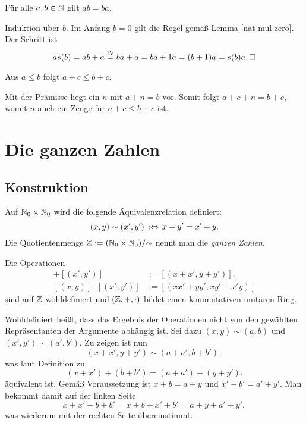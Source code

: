 \begin{Satz}\newlinefirst
Für alle $a,b\in\mathbb N$ gilt $ab=ba$.
\end{Satz}
\begin{Beweis}
Induktion über $b$. Im Anfang $b=0$ gilt die Regel gemäß
Lemma \ref{nat-mul-zero}. Der Schritt ist
\[as(b) = ab+a \stackrel{\mathrm{IV}}= ba+a = ba + 1a = (b+1)a = s(b)a.\,\Box\]
\end{Beweis}

\begin{Satz}
Aus $a\le b$ folgt $a+c\le b+c$.
\end{Satz}
\begin{Beweis}
Mit der Prämisse liegt ein $n$ mit $a+n = b$ vor. Somit folgt
$a+c+n = b+c$, womit $n$ auch ein Zeuge für $a+c\le b+c$ ist.\,\qedsymbol
\end{Beweis}

\section{Die ganzen Zahlen}

\subsection{Konstruktion}

\begin{Definition}\newlinefirst
Auf $\mathbb N_0\times\mathbb N_0$ wird die folgende Äquivalenzrelation definiert:
\[(x,y)\sim (x',y')\,:\Leftrightarrow\, x+y' = x'+y.\]
Die Quotientenmenge $\mathbb Z := (\mathbb N_0\times\mathbb N_0)/{\sim}$ nennt man
die \emph{ganzen Zahlen}.
\end{Definition}

\begin{Satz}\newlinefirst
Die Operationen
\begin{align*}
[(x,y)]+[(x',y')] &:= [(x+x',y+y')],\\
[(x,y)]\cdot [(x',y')] &:= [(xx'+yy',xy'+x'y)]
\end{align*}
sind auf $\mathbb Z$ wohldefiniert und $(\mathbb Z,+,\cdot)$ bildet einen
kommutativen unitären Ring.
\end{Satz}
 Wohldefiniert heißt, dass das Ergebnis der Operationen
nicht von den gewählten Repräsentanten der Argumente abhängig ist.
Sei dazu $(x,y)\sim(a,b)$ und
$(x',y')\sim (a',b')$. Zu zeigen ist nun
\[(x+x',y+y')\sim (a+a',b+b'),\]
was laut Definition zu
\[(x+x')+(b+b') = (a+a')+(y+y').\]
äquivalent ist. Gemäß Voraussetzung ist $x+b=a+y$ und $x'+b'=a'+y'$.
Man bekommt damit auf der linken Seite
\[x+x'+b+b' = x+b+x'+b' = a+y+a'+y',\]
was wiederum mit der rechten Seite übereinstimmt.

